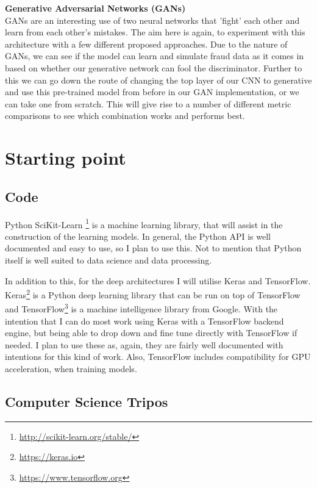 \documentclass[12pt,a4paper,twoside]{article}
\begin{document}
\begin{itemize}
	\textbf{Generative Adversarial Networks (GANs) \cite{2014arXiv1406.2661G}} \\
	GANs are an interesting use of two neural networks that 'fight' each other and learn from each other's mistakes. The aim here is again, to experiment with this architecture with a few different proposed approaches. Due to the nature of GANs, we can see if the model can learn and simulate fraud data as it comes in based on whether our generative network can fool the discriminator. Further to this we can go down the route of changing the top layer of our CNN to generative and use this pre-trained model from before in our GAN implementation, or we can take one from scratch. This will give rise to a number of different metric comparisons to see which combination works and performs best. 

\end{itemize}

\section*{Starting point}
 
 \subsection*{Code}
 
Python SciKit-Learn \footnote{\href{ http://scikit-learn.org/stable/}{ http://scikit-learn.org/stable/}} is a machine learning library, that will assist in the construction of the learning models. In general, the Python API is well documented and easy to use, so I plan to use this. Not to mention that Python itself is well suited to data science and data processing.

In addition to this, for the deep architectures I will utilise Keras and TensorFlow. Keras\footnote{\href{https://keras.io}{https://keras.io}} is a Python deep learning library that can be run on top of TensorFlow and TensorFlow\footnote{\href{https://www.tensorflow.org}{https://www.tensorflow.org}} is a machine intelligence library from Google. With the intention that I can do most work using Keras with a TensorFlow backend engine, but being able to drop down and fine tune directly with TensorFlow if needed. I plan to use these as, again, they are fairly well documented with intentions for this kind of work. Also, TensorFlow includes compatibility for GPU acceleration, when training models. 
 
 \subsection*{Computer Science Tripos}
 
\end{document}
